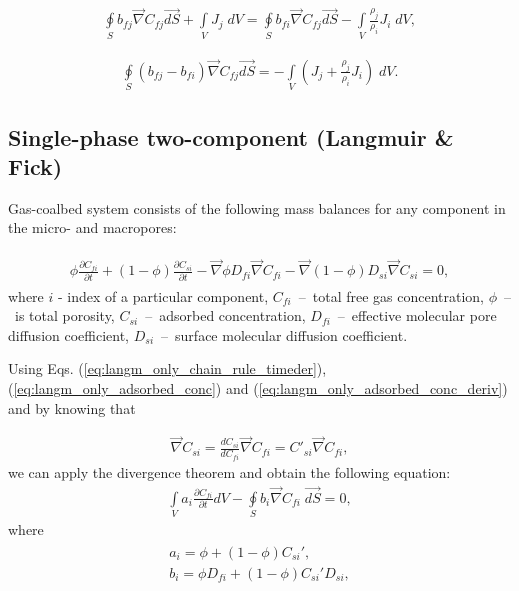 \documentclass[a4paper,14pt,english]{extreport}
\begin{document}
\begin{eqnarray}
\label{eq:multiphase_diffusivity_simplified_integral}
\oint \limits_{S} b_{fj} \vec{\nabla}C_{fj} \vec{dS}
+ \int \limits_{V} J_{j} \; dV
= \oint \limits_{S} b_{fi} \vec{\nabla}C_{fj} \vec{dS}
-\int \limits_{V} \frac{\rho_j}{\rho_i}J_{i} \; dV,
\end{eqnarray}

\begin{eqnarray}
\label{eq:multiphase_diffusivity_simplified_integral}
\oint \limits_{S} \left(b_{fj}-b_{fi}\right) \vec{\nabla}C_{fj} \vec{dS}
= -\int \limits_{V} \left(J_{j}+\frac{\rho_j}{\rho_i}J_{i}\right) \; dV.
\end{eqnarray}

\subsection*{Single-phase two-component (Langmuir \& Fick)}
Gas-coalbed system consists of the following mass balances for any component in the micro- and macropores:

\begin{eqnarray}
\begin{gathered}
\label{eq:langm_fick_diffusivity_differential}
\phi\frac{\partial C_{fi}}{\partial t} + \left(\mathit{1}-\phi\right)\frac{\partial C_{si}}{\partial t} - \vec{\nabla} \phi D_{fi} \vec{\nabla}C_{fi} - \vec{\nabla}\left(\mathit{1}-\phi \right) D_{si} \vec{\nabla}C_{si} =  \mathit{0},
\end{gathered}
\end{eqnarray}
where $i$ - index of  a particular component, $C_{fi}$~--~total free gas concentration, $\phi$~--~is total porosity, $C_{si}$~--~adsorbed concentration, $D_{fi}$~--~effective molecular pore diffusion coefficient, $D_{si}$~--~surface molecular diffusion coefficient.

Using Eqs. (\ref{eq:langm_only_chain_rule_timeder}), (\ref{eq:langm_only_adsorbed_conc}) and (\ref{eq:langm_only_adsorbed_conc_deriv}) and by knowing that

\begin{eqnarray}
\label{eq:langm_fick_chain_rule_spaceder}
\vec\nabla C_{si} =  \frac{dC_{si}}{dC_{fi}}\vec\nabla C_{fi} = C'_{si}\vec\nabla C_{fi},
\end{eqnarray}
we can apply the divergence theorem and obtain the following equation:
\begin{eqnarray}
\label{eq:langm_fick_diffusivity_simplified_integral}
\int \limits_{V} a_{i} \frac{\partial C_{fi}}{\partial t} d V - \oint \limits_{S} b_{i} \vec{\nabla}C_{fi} \; \vec{dS} =  \mathit{0},
\end{eqnarray}
where  
\begin{eqnarray}
\begin{gathered}
\label{eq:langm_fick_diffusivity_a_b_coeffs}
a_{i}  =  \phi + \left(\mathit{1}-\phi \right)C_{si}', \\ 
b_{i}  = \phi D_{fi} + \left(\mathit{1}-\phi \right) C_{si}'D_{si},
\end{gathered}
\end{eqnarray}
\end{document}
